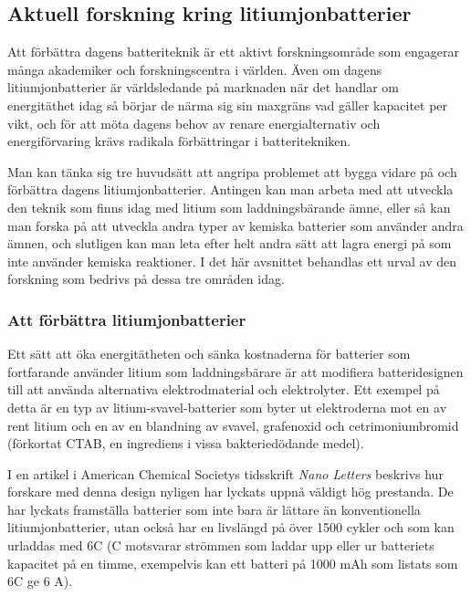 \documentclass[a4paper,12pt]{article}
\begin{document}
\subsection{Aktuell forskning kring litiumjonbatterier}
Att förbättra dagens batteriteknik är ett aktivt forskningsområde som engagerar många akademiker och forskningscentra i världen. Även om dagens litiumjonbatterier är världsledande på marknaden när det handlar om energitäthet idag så börjar de närma sig sin maxgräns vad gäller kapacitet per vikt, och för att möta dagens behov av renare energialternativ och energiförvaring krävs radikala förbättringar i batteritekniken. \cite{better-battery} 

Man kan tänka sig tre huvudsätt att angripa problemet att bygga vidare på och förbättra dagens litiumjonbatterier. Antingen kan man arbeta med att utveckla den teknik som finns idag med litium som laddningsbärande ämne, eller så kan man forska på att utveckla andra typer av kemiska batterier som använder andra ämnen, och slutligen kan man leta efter helt andra sätt att lagra energi på som inte använder kemiska reaktioner. I det här avsnittet behandlas ett urval av den forskning som bedrivs på dessa tre områden idag.

\subsubsection{Att förbättra litiumjonbatterier}
Ett sätt att öka energitätheten och sänka kostnaderna för batterier som fortfarande använder litium som laddningsbärare är att modifiera batteridesignen till att använda alternativa elektrodmaterial och elektrolyter. Ett exempel på detta är en typ av litium-svavel-batterier som byter ut elektroderna mot en av rent litium och en av en blandning av svavel, grafenoxid och cetrimoniumbromid (förkortat CTAB, en ingrediens i vissa bakteriedödande medel).\cite{li-s}

I en artikel i American Chemical Societys tidsskrift \emph{Nano Letters} beskrivs hur forskare med denna design nyligen har lyckats uppnå väldigt hög prestanda. De har lyckats framställa batterier som inte bara är lättare än konventionella litiumjonbatterier, utan också har en livslängd på över 1500 cykler och som kan urladdas med 6C (C motsvarar strömmen som laddar upp eller ur batteriets kapacitet på en timme, exempelvis kan ett batteri på 1000 mAh som listats som 6C ge 6 A). \cite{li-s}
\end{document}

